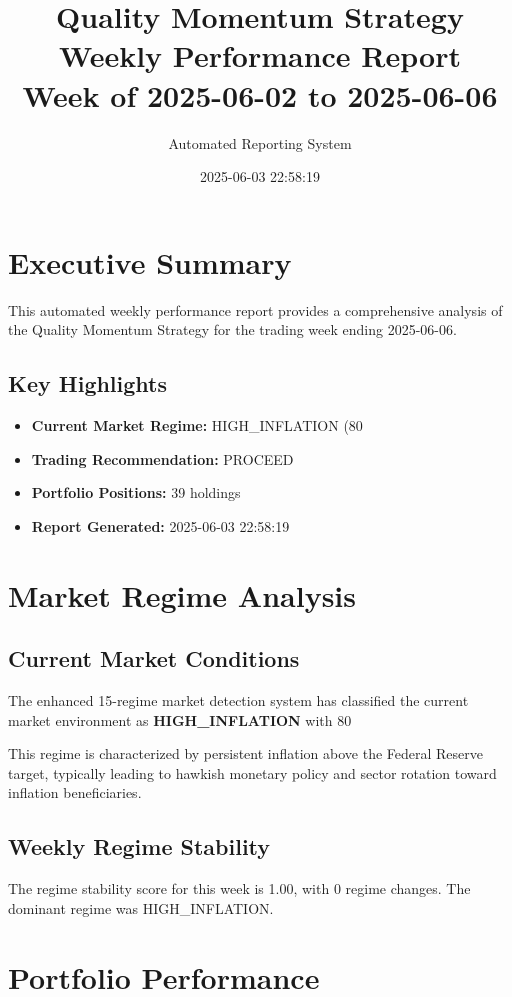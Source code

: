 \documentclass[11pt,letterpaper]{article}
\title{\Huge\textbf{Quality Momentum Strategy} \\ 
        \Large Weekly Performance Report \\
        \large Week of 2025-06-02 to 2025-06-06}
\author{Automated Reporting System}
\date{2025-06-03 22:58:19}
\begin{document}
\maketitle

\section*{Executive Summary}

This automated weekly performance report provides a comprehensive analysis of the Quality Momentum Strategy for the trading week ending 2025-06-06.

\subsection*{Key Highlights}
\begin{itemize}
    \item \textbf{Current Market Regime:} HIGH\_INFLATION (80%
    \item \textbf{Trading Recommendation:} \textcolor{proceed}{PROCEED}
    \item \textbf{Portfolio Positions:} 39 holdings
    \item \textbf{Report Generated:} 2025-06-03 22:58:19
\end{itemize}

\section*{Market Regime Analysis}

\subsection*{Current Market Conditions}
The enhanced 15-regime market detection system has classified the current market environment as \textbf{HIGH\_INFLATION} with 80%

This regime is characterized by persistent inflation above the Federal Reserve target, typically leading to hawkish monetary policy and sector rotation toward inflation beneficiaries.

\subsection*{Weekly Regime Stability}
The regime stability score for this week is 1.00, with 0 regime changes. The dominant regime was HIGH_INFLATION.

\section*{Portfolio Performance}
\end{document}
